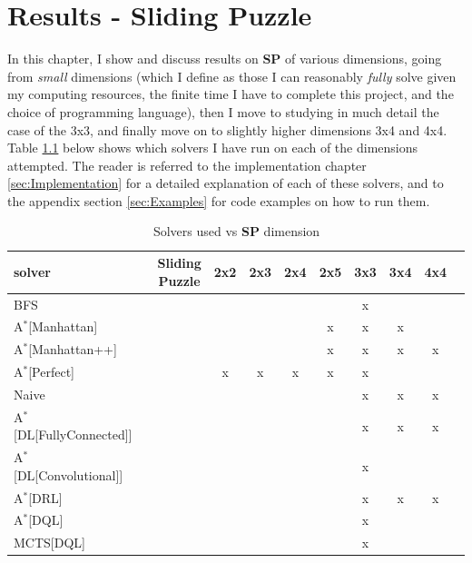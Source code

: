 
\chapter{Results - Sliding Puzzle} %

\label{sec:ResultsSP} %


In this chapter, I show and discuss results on \textbf{SP} of various dimensions, going from \textit{small} dimensions (which I define as those I can reasonably \textit{fully} solve given my computing resources, the finite time I have to complete this project, and the choice of programming language), then I move to studying in much detail the case of the 3x3, and finally move on to slightly higher dimensions 3x4 and 4x4. Table \ref{tab:gridSP} below shows which solvers I have run on each of the dimensions attempted. The reader is referred to the implementation chapter \ref{sec:Implementation} for a detailed explanation of each of these solvers, and to the appendix section \ref{sec:Examples} for code examples on how to run them.

\begin{table}[H]
\begin{center}
\begin{tabular}{l*{9}{c}r}
\hline
\textbf{solver}      & & \textbf{Sliding Puzzle} & \textbf{2x2} & \textbf{2x3} & \textbf{2x4} & \textbf{2x5}  & \textbf{3x3} & \textbf{3x4} & \textbf{4x4} \\ 
\hline
BFS   & & & & & & &  x  & & \\
\hline
A$^{*}$[Manhattan]   & & & & & &  x  &  x  &  x  & \\
\hline
A$^{*}$[Manhattan++]   & & & & & &  x  &  x  &  x  & x \\
\hline
A$^{*}$[Perfect]   & & &  x  &  x  &  x  &  x  &  x  & & \\
\hline
Naive   & & & & & & &  x  &  x  & x \\
\hline
A$^{*}$[DL[FullyConnected]]   & & & & & & &  x  &  x  & x \\
\hline
A$^{*}$[DL[Convolutional]]   & & & & & & &  x  &  & \\
\hline
A$^{*}$[DRL]   & & & & & & &  x  &  x  & x \\
\hline
A$^{*}$[DQL]   & & & & & & &  x  & & \\
\hline
MCTS[DQL]        & & & & & & &  x  & & \\
\end{tabular}
\caption{\label{tab:gridSP} Solvers used vs \textbf{SP} dimension}
\end{center}
\end{table}

